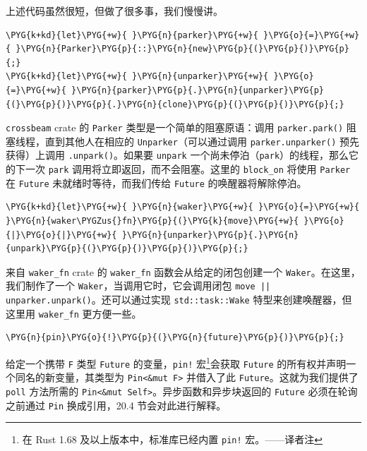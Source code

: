 上述代码虽然很短，但做了很多事，我们慢慢讲。

\begin{Verbatim}[commandchars=\\\{\},breaklines=true,breakanywhere=true,fontsize=\codefont,xleftmargin=17bp]
\PYG{k+kd}{let}\PYG{+w}{ }\PYG{n}{parker}\PYG{+w}{ }\PYG{o}{=}\PYG{+w}{ }\PYG{n}{Parker}\PYG{p}{::}\PYG{n}{new}\PYG{p}{(}\PYG{p}{)}\PYG{p}{;}
\PYG{k+kd}{let}\PYG{+w}{ }\PYG{n}{unparker}\PYG{+w}{ }\PYG{o}{=}\PYG{+w}{ }\PYG{n}{parker}\PYG{p}{.}\PYG{n}{unparker}\PYG{p}{(}\PYG{p}{)}\PYG{p}{.}\PYG{n}{clone}\PYG{p}{(}\PYG{p}{)}\PYG{p}{;}
\end{Verbatim}

\texttt{crossbeam} crate 的 \texttt{Parker} 类型是一个简单的阻塞原语：调用 \texttt{parker.park()} 阻塞线程，直到其他人在相应的 \texttt{Unparker}（可以通过调用 \texttt{parker.unparker()} 预先获得）上调用 \texttt{.unpark()}。如果要 \texttt{unpark} 一个尚未停泊（\texttt{park}）的线程，那么它的下一次 \texttt{park} 调用将立即返回，而不会阻塞。这里的 \texttt{block\_on} 将使用 \texttt{Parker} 在 \texttt{Future} 未就绪时等待，而我们传给 \texttt{Future} 的唤醒器将解除停泊。

\begin{Verbatim}[commandchars=\\\{\},breaklines=true,breakanywhere=true,fontsize=\codefont,xleftmargin=17bp]
\PYG{k+kd}{let}\PYG{+w}{ }\PYG{n}{waker}\PYG{+w}{ }\PYG{o}{=}\PYG{+w}{ }\PYG{n}{waker\PYGZus{}fn}\PYG{p}{(}\PYG{k}{move}\PYG{+w}{ }\PYG{o}{|}\PYG{o}{|}\PYG{+w}{ }\PYG{n}{unparker}\PYG{p}{.}\PYG{n}{unpark}\PYG{p}{(}\PYG{p}{)}\PYG{p}{)}\PYG{p}{;}
\end{Verbatim}

来自 \texttt{waker\_fn} crate 的 \texttt{waker\_fn} 函数会从给定的闭包创建一个 \texttt{Waker}。在这里，我们制作了一个 \texttt{Waker}，当调用它时，它会调用闭包 \texttt{move || unparker.unpark()}。还可以通过实现 \texttt{std::task::Wake} 特型来创建唤醒器，但这里用 \texttt{waker\_fn} 更方便一些。

\begin{Verbatim}[commandchars=\\\{\},breaklines=true,breakanywhere=true,fontsize=\codefont,xleftmargin=17bp]
\PYG{n}{pin}\PYG{o}{!}\PYG{p}{(}\PYG{n}{future}\PYG{p}{)}\PYG{p}{;}
\end{Verbatim}

给定一个携带 \texttt{F} 类型 \texttt{Future} 的变量，\texttt{pin!} 宏\footnote{在 Rust 1.68 及以上版本中，标准库已经内置 \texttt{pin!} 宏。——译者注}会获取 \texttt{Future} 的所有权并声明一个同名的新变量，其类型为 \texttt{Pin<\&mut F>} 并借入了此 \texttt{Future}。这就为我们提供了 \texttt{poll} 方法所需的 \texttt{Pin<\&mut Self>}。异步函数和异步块返回的 \texttt{Future} 必须在轮询之前通过 \texttt{Pin} 换成引用，20.4 节会对此进行解释。

